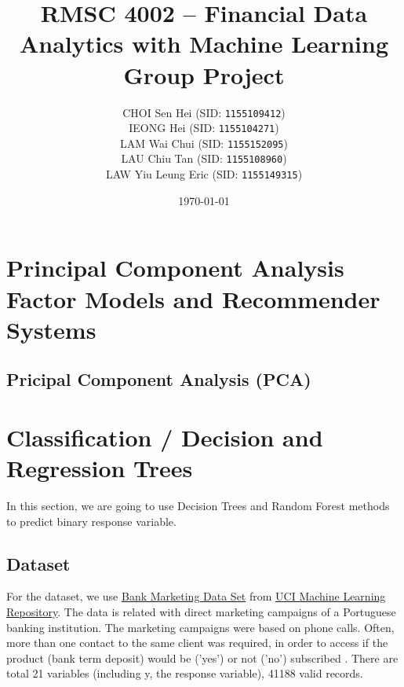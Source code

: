 \documentclass[11pt,a4paper]{article}
\begin{document}
    \thispagestyle{empty}
    \title{\textsc{RMSC 4002} -- Financial Data Analytics with Machine Learning \\ Group Project}
    \author{
        CHOI Sen Hei (SID: \texttt{1155109412}) \\
        IEONG Hei (SID: \texttt{1155104271}) \\
        LAM Wai Chui (SID: \texttt{1155152095}) \\
        LAU Chiu Tan (SID: \texttt{1155108960}) \\
        LAW Yiu Leung Eric (SID: \texttt{1155149315})
    }
    \date{\today}
    \maketitle
    
    \tableofcontents
    \newpage
    
    
    \setcounter{page}{1}
    
    \section{Principal Component Analysis Factor Models and Recommender Systems}
    \subsection{Pricipal Component Analysis (PCA)}
    
    
    \newpage
    \section{Classification / Decision and Regression Trees}
    In this section, we are going to use Decision Trees and Random Forest methods to predict binary response variable.
    
    \subsection{Dataset}
    For the dataset, we use \href{https://archive.ics.uci.edu/ml/datasets/bank+marketing}{Bank Marketing Data Set} from  \href{https://archive.ics.uci.edu/ml/index.php}{UCI Machine Learning Repository}.
    The data is related with direct marketing campaigns of a Portuguese banking institution. The marketing campaigns were based on phone calls. Often, more than one contact to the same client was required, in order to access if the product (bank term deposit) would be ('yes') or not ('no') subscribed \cite{MORO201422}. There are total 21 variables (including y, the response variable), 41188 valid records.
    
\end{document}
